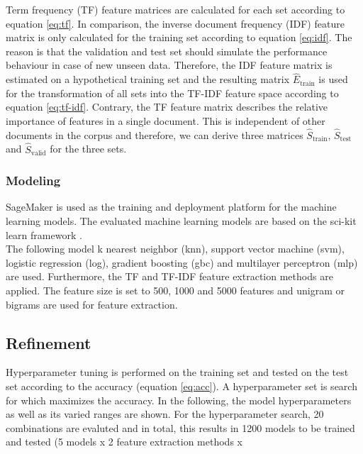 \documentclass[a4paper,12pt,nottoc]{article}
\begin{document}
\noindent Term frequency (TF) feature matrices are calculated for each set according to equation \ref{eq:tf}. In comparison, the inverse document frequency (IDF) feature matrix is only calculated for the training set according to equation \ref{eq:idf}. The reason is that the validation and test set should simulate the performance behaviour in case of new unseen data. Therefore,  the IDF feature matrix is estimated on a hypothetical training set and the resulting matrix $\hat{E}_{\textrm{train}}$ is used for the transformation of all sets into the TF-IDF feature space according to equation \ref{eq:tf-idf}. Contrary, the TF feature matrix describes the relative importance of features in a single document. This is independent of other documents in the corpus and therefore, we can derive three matrices $\hat{S}_{\textrm{train}}$, $\hat{S}_{\textrm{test}}$ and $\hat{S}_{\textrm{valid}}$ for the three sets.

\subsubsection{Modeling}

\noindent SageMaker \cite{bib:sagemaker} is used as the training and deployment platform for the machine learning models. The evaluated machine learning models are based on the sci-kit learn framework \cite{bib:scikit-learn}.\\

\noindent The following model k nearest neighbor (knn), support vector machine (svm), logistic regression (log), gradient boosting (gbc) and multilayer perceptron (mlp) are used. Furthermore, the TF and TF-IDF feature extraction methods are applied. The feature size is set to 500, 1000 and 5000 features and unigram or bigrams are used for feature extraction.

\subsection{Refinement}

Hyperparameter tuning is performed on the training set and tested on the test set according to the accuracy (equation \ref{eq:acc}). A hyperparameter set is search for which maximizes the accuracy. In the following, the model hyperparameters as well as its varied ranges are shown. For the hyperparameter search, 20 combinations are evaluted and in total, this results in 1200 models to be trained and tested (5 models x 2 feature extraction methods x 
\end{document}
